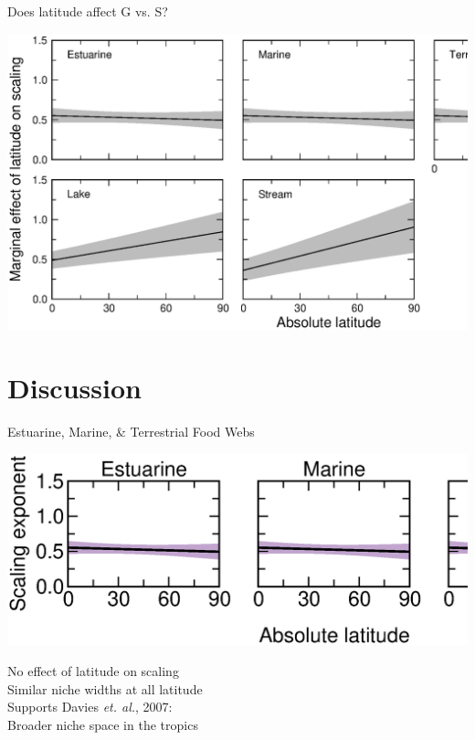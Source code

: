 \documentclass{beamer}
\begin{document}
  \begin{frame}{Does latitude affect G vs. S?}
    \begin{center}
      \includegraphics*[width=.8\textwidth]{Figures/results/Gen_vs_S_marginal.eps}

    \end{center}
  \end{frame}

\section*{Discussion}

  \begin{frame}{Estuarine, Marine, \& Terrestrial Food Webs}
    \begin{center}
      \includegraphics*[width=.8\textwidth]{Figures/results/no_effect.eps}

      \vspace{1cm}
      {\color{white} No effect of latitude on scaling\\
      Similar niche widths at all latitude\\
      Supports Davies \emph{et. al.}, 2007:\\
      Broader niche space in the tropics}

    \end{center}
  \end{frame}
\end{document}
